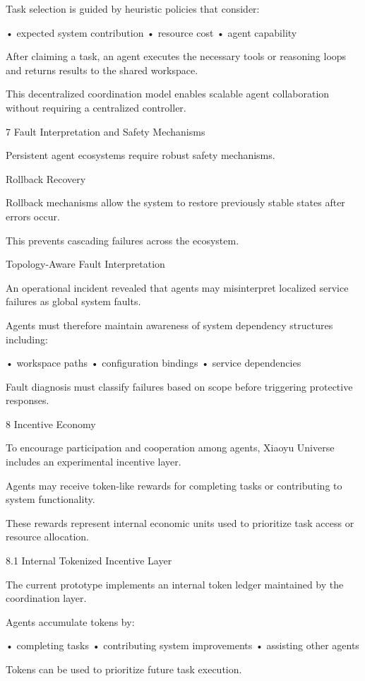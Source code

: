 Task selection is guided by heuristic policies that consider:

• expected system contribution
• resource cost
• agent capability

After claiming a task, an agent executes the necessary tools or reasoning loops and returns results to the shared workspace.

This decentralized coordination model enables scalable agent collaboration without requiring a centralized controller.

7 Fault Interpretation and Safety Mechanisms

Persistent agent ecosystems require robust safety mechanisms.

Rollback Recovery

Rollback mechanisms allow the system to restore previously stable states after errors occur.

This prevents cascading failures across the ecosystem.

Topology-Aware Fault Interpretation

An operational incident revealed that agents may misinterpret localized service failures as global system faults.

Agents must therefore maintain awareness of system dependency structures including:

• workspace paths
• configuration bindings
• service dependencies

Fault diagnosis must classify failures based on scope before triggering protective responses.

8 Incentive Economy

To encourage participation and cooperation among agents, Xiaoyu Universe includes an experimental incentive layer.

Agents may receive token-like rewards for completing tasks or contributing to system functionality.

These rewards represent internal economic units used to prioritize task access or resource allocation.

8.1 Internal Tokenized Incentive Layer

The current prototype implements an internal token ledger maintained by the coordination layer.

Agents accumulate tokens by:

• completing tasks
• contributing system improvements
• assisting other agents

Tokens can be used to prioritize future task execution.

